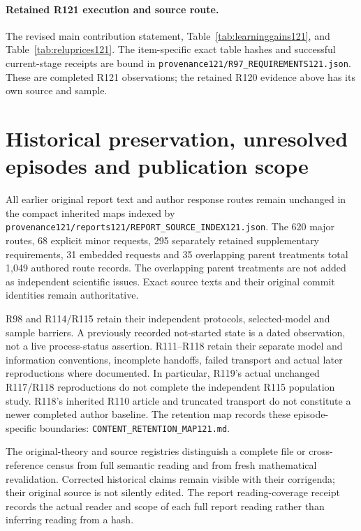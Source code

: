 \paragraph{Retained R121 execution and source route.}
The revised main contribution statement, Table~\ref{tab:learninggains121}, and Table~\ref{tab:reluprices121}.
The item-specific exact table hashes and successful current-stage receipts are bound in \nolinkurl{provenance121/R97_REQUIREMENTS121.json}. These are completed R121 observations; the retained R120 evidence above has its own source and sample.

\section{Historical preservation, unresolved episodes and publication scope}
All earlier original report text and author response routes remain unchanged
in the compact inherited maps indexed by
\nolinkurl{provenance121/reports121/REPORT_SOURCE_INDEX121.json}.
The 620 major routes, 68 explicit minor requests, 295 separately retained
supplementary requirements, 31 embedded requests and 35 overlapping parent
treatments total 1,049 authored route records. The overlapping parent
treatments are not added as independent scientific issues. Exact source
texts and their original commit identities remain authoritative.

R98 and R114/R115 retain their independent protocols, selected-model and
sample barriers. A previously recorded not-started state is a dated
observation, not a live process-status assertion. R111--R118 retain their
separate model and information conventions, incomplete handoffs, failed
transport and actual later reproductions where documented. In particular,
R119's actual unchanged R117/R118 reproductions do not complete the
independent R115 population study. R118's inherited R110 article and
truncated transport do not constitute a newer completed author baseline.
The retention map records these episode-specific boundaries:
\nolinkurl{CONTENT_RETENTION_MAP121.md}.

The original-theory and source registries distinguish a complete file or
cross-reference census from full semantic reading and from fresh
mathematical revalidation. Corrected historical claims remain visible
with their corrigenda; their original source is not silently edited.
The report reading-coverage receipt records the actual reader and scope
of each full report reading rather than inferring reading from a hash.

